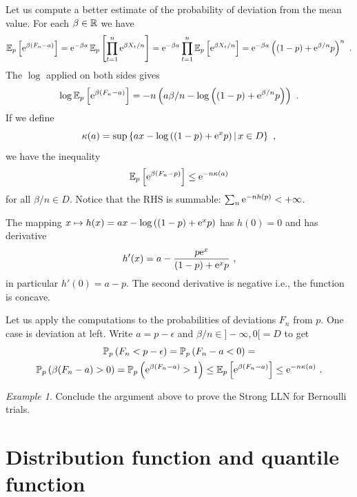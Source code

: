 \documentclass[12pt,a4paper]{amsart}
\theoremstyle{plain}%
\theoremstyle{definition}
\theoremstyle{remark}
\newtheorem{example}{Example}
\begin{document}
Let us compute a better estimate of the probability of deviation from the mean value. For each $\beta \in \mathbb{R}$ we have
\begin{equation*}
  \expectat p {\euler^{\beta(F_n - a)}} = \euler^{-\beta a} \expectat p {\prod_{t=1}^n \euler^{\beta X_t/n}} = \euler^{-\beta a} \prod_{t=1}^n \expectat p {\euler^{\beta X_t/n}} = \euler^{-\beta a} \left((1-p)+ \euler^{\beta/n}p\right)^n  \ .
\end{equation*}
The $\log$ applied on both sides gives
\begin{equation*}
  \log \operatorname{\mathbb E}_{p}\left[\mathrm{e}^{\beta(F_n - a)}\right] = -n\left(a \beta/n - \log\left((1-p) + \mathrm{e}^{\beta/n} p\right)\right)  \ .
\end{equation*}
If we define
\begin{equation*}
  \kappa(a) = \sup \left\{a x - \log\left((1-p) + \mathrm{e}^{x} p\right) \, \middle| \, x \in D \right\} \ ,
\end{equation*}
we have the inequality
\begin{equation*}
\operatorname{\mathbb E}_{p}\left[\mathrm{e}^{\beta(F_n - p)}\right] \leq \mathrm{e}^{-n\kappa(a)} 
\end{equation*}
for all $\beta/n \in D$. Notice that the RHS is summable: $\sum_n \mathrm{e}^{-nh(p)} < + \infty$.

The mapping $x \mapsto h(x) = ax - \log\left((1-p) + \mathrm{e}^{x} p\right)$ has $h(0) = 0$ and has derivative
\begin{equation*}
h'(x) =  a - \frac{p \mathrm{e}^x}{(1-p) + \mathrm{e}^{x} p} \ ,
\end{equation*}
in particular $h'(0) = a - p$. The second derivative is negative i.e., the function is concave.

Let us apply the computations to the probabilities of deviations $F_n$ from $p$. One case is deviation at left. Write $a = p - \epsilon$ and $\beta/n \in ]-\infty,0[ = D$ to get
\begin{multline*}
  \probat p {F_n < p - \epsilon} = \probat p {F_n - a < 0} =   \\ \probat p {\beta(F_n-a) > 0} = \probat p {\euler^{\beta(F_n-a)} > 1} \leq \expectat p {\euler^{\beta(F_n-a)}} \leq \euler^{-n \kappa(a)} \ .
\end{multline*}

\begin{example}
  Conclude the argument above to prove the Strong LLN for Bernoulli trials.
\end{example}

\section{Distribution function and quantile function}
\label{sec:distr-funct-quant}
\end{document}

